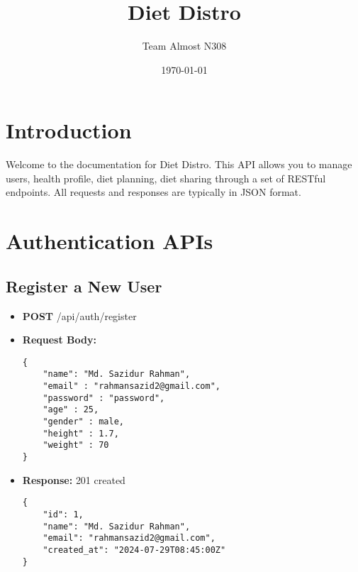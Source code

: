 \documentclass[11pt, a4paper]{article}
\begin{document}
\title{Diet Distro}
\author{Team Almost N308}
\date{\today}
\maketitle

\tableofcontents
\newpage

\section{Introduction}
Welcome to the documentation for Diet Distro. This API allows you to manage users, health profile, diet planning, diet sharing through a set of RESTful endpoints. All requests and responses are typically in JSON format.

\section{Authentication APIs}
\subsection{\textbf{\large Register a New User}}
\begin{itemize}
    \item \textbf{POST} \colorbox{gray!20}{\tiny /api/auth/register}
    \item \textbf{Request Body:}
    \begin{lstlisting}[style=jsonstyle]
{
    "name": "Md. Sazidur Rahman",
    "email" : "rahmansazid2@gmail.com",
    "password" : "password",
    "age" : 25,
    "gender" : male,
    "height" : 1.7,
    "weight" : 70
}
\end{lstlisting}
    \item \textbf{Response:} \colorbox{gray!20}{201 created}
    \begin{lstlisting}[style = jsonstyle]
{
    "id": 1,
    "name": "Md. Sazidur Rahman",
    "email": "rahmansazid2@gmail.com",
    "created_at": "2024-07-29T08:45:00Z"
}
    \end{lstlisting}
    
\end{itemize}
\end{document}

